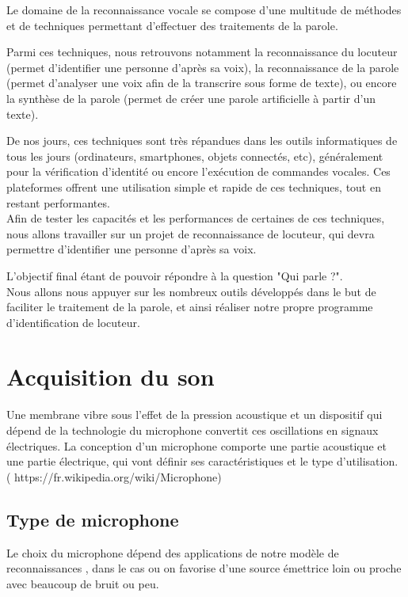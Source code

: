 \documentclass[a4paper, 12pt]{book}
\newcounter{program}[subsection]
\begin{document}
Le domaine de la reconnaissance vocale se compose d'une multitude de méthodes et de techniques permettant d'effectuer des traitements de la parole. 

Parmi ces techniques, nous retrouvons notamment la reconnaissance du locuteur (permet d'identifier une personne d'après sa voix), la reconnaissance de la parole (permet d'analyser une voix afin de la transcrire sous forme de texte), ou encore la synthèse de la parole (permet de créer une parole artificielle à partir d'un texte).

De nos jours, ces techniques sont très répandues dans les outils informatiques de tous les jours (ordinateurs, smartphones, objets connectés, etc), généralement pour la vérification d'identité ou encore l'exécution de commandes vocales. Ces plateformes offrent une utilisation simple et rapide de ces techniques, tout en restant performantes.\\

Afin de tester les capacités et les performances de certaines de ces techniques, nous allons travailler sur un projet de reconnaissance de locuteur, qui devra permettre d'identifier une personne d'après sa voix.

L'objectif final étant de pouvoir répondre à la question "Qui parle ?".\\

Nous allons nous appuyer sur les nombreux outils développés dans le but de faciliter le traitement de la parole, et ainsi réaliser notre propre programme d'identification de locuteur.


\chapter{Acquisition du son}

Une membrane vibre sous l'effet de la pression acoustique et un dispositif qui dépend de la technologie du microphone convertit ces oscillations en signaux électriques. La conception d'un microphone comporte une partie acoustique et une partie électrique, qui vont définir ses caractéristiques et le type d'utilisation. ( https://fr.wikipedia.org/wiki/Microphone)

\section{Type de microphone}

Le choix du microphone dépend des applications de notre modèle de reconnaissances , dans le cas ou on favorise d’une source émettrice loin ou proche avec beaucoup de bruit ou peu. 
\end{document}
